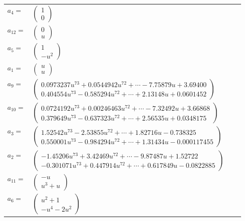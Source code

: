 \documentclass[1p]{elsarticle_modified}
\theoremstyle{definition}
\begin{document}
\begin{tabular}{m{7pt} m{180pt} m{7pt} m{180pt} }
\flushright $a_{4}=$&$\begin{pmatrix}1\\0\end{pmatrix}$ \\
\flushright $a_{12}=$&$\begin{pmatrix}0\\u\end{pmatrix}$ \\
\flushright $a_{5}=$&$\begin{pmatrix}1\\- u^2\end{pmatrix}$ \\
\flushright $a_{1}=$&$\begin{pmatrix}u\\u\end{pmatrix}$ \\
\flushright $a_{9}=$&$\begin{pmatrix}0.0973237 u^{73}+0.0544942 u^{72}+\cdots-7.75879 u+3.69400\\0.404554 u^{73}-0.585294 u^{72}+\cdots+2.13148 u+0.0601452\end{pmatrix}$ \\
\flushright $a_{10}=$&$\begin{pmatrix}0.0724192 u^{73}+0.00246463 u^{72}+\cdots-7.32492 u+3.66868\\0.379649 u^{73}-0.637323 u^{72}+\cdots+2.56535 u+0.0348175\end{pmatrix}$ \\
\flushright $a_{3}=$&$\begin{pmatrix}1.52542 u^{73}-2.53855 u^{72}+\cdots+1.82716 u-0.738325\\0.550001 u^{73}-0.984294 u^{72}+\cdots+1.31434 u-0.000117455\end{pmatrix}$ \\
\flushright $a_{2}=$&$\begin{pmatrix}-1.45206 u^{73}+3.42469 u^{72}+\cdots-9.87487 u+1.52722\\-0.301071 u^{73}+0.447914 u^{72}+\cdots+0.617849 u-0.0822885\end{pmatrix}$ \\
\flushright $a_{11}=$&$\begin{pmatrix}- u\\u^3+u\end{pmatrix}$ \\
\flushright $a_{6}=$&$\begin{pmatrix}u^2+1\\- u^4-2 u^2\end{pmatrix}$ \\

\end{tabular}
\end{document}
